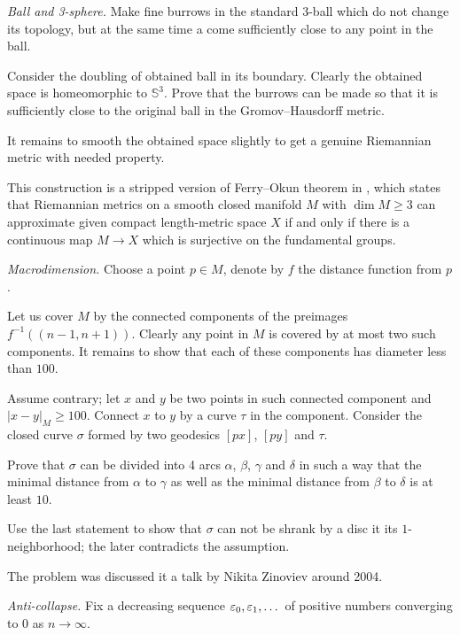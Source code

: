 \textit{Ball and 3-sphere.}
Make fine burrows in the standard 3-ball which do not change its topology,
but at the same time a come sufficiently close to any point in the ball.

Consider the doubling of obtained ball in its boundary.
Clearly the obtained space is homeomorphic to $\mathbb{S}^3$.
Prove that the burrows can be made 
so that it is sufficiently close to the original ball 
in the Gromov--Hausdorff metric.

It remains to smooth the obtained space slightly 
to get a genuine Riemannian metric with needed property.

This construction is a stripped version of Ferry--Okun theorem in \cite{ferry-okun},
which states that Riemannian metrics on a smooth closed manifold $M$ with $\dim M\ge 3$ 
can approximate given compact length-metric space $X$ 
if and only if 
there is a continuous map $M\to X$
which is surjective on the fundamental groups. 

\textit{Macrodimension.}
Choose a point $p\in M$,
denote by $f$ the distance function from $p$.

Let us cover $M$ by the connected components of the preimages 
$f^{-1}((n-1,n+1))$.
Clearly any point in $M$ is covered by at most two such components.
It remains to show that each of these components has diameter less than $100$.

Assume contrary; let $x$ and $y$ be two points in such connected component 
and $|x-y|_M\ge 100$.
Connect $x$ to $y$ by a curve $\tau$ in the component.
Consider the closed curve $\sigma$ formed by two geodesics $[px]$, $[py]$ and $\tau$.

Prove that $\sigma$ can be divided into 4 arcs $\alpha$, $\beta$, $\gamma$ and $\delta$
in such a way that the minimal distance from $\alpha$ to $\gamma$ as well as the minimal distance from $\beta$ to $\delta$ is at least $10$.

Use the last statement to show that $\sigma$ 
can not be shrank 
by a disc it its $1$-neighborhood;
the later contradicts the assumption.

The problem was discussed it a talk by Nikita Zinoviev around 2004.

\textit{Anti-collapse.}
Fix a decreasing sequence $\varepsilon_0,\varepsilon_1,\dots$ of positive numbers converging to $0$ as $n\to \infty$.

